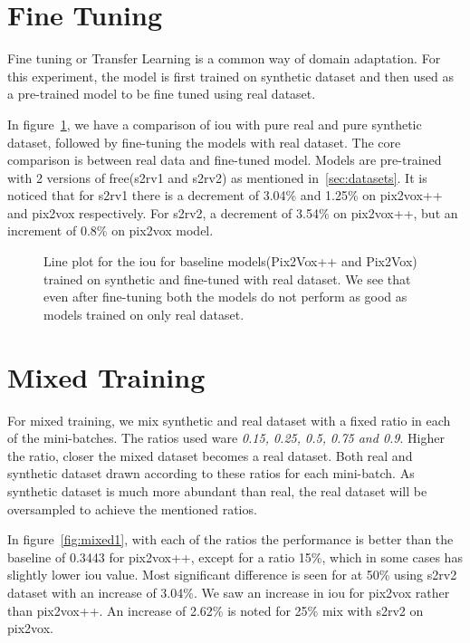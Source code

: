 
\section{Fine Tuning}\label{sec:fine-tuning}
Fine tuning or Transfer Learning is a common way of domain adaptation.
For this experiment, the model is first trained on synthetic dataset and then used as a pre-trained model to be fine tuned using real dataset.

In figure~\ref{fig:finetuning1}, we have a comparison of \gls{iou}  with pure real and pure synthetic dataset, followed by fine-tuning the models with real dataset.
The core comparison is between real data and fine-tuned model.
Models are pre-trained with 2 versions of \gls{free}(\gls{s2rv1} and \gls{s2rv2}) as mentioned in~\ref{sec:datasets}.
It is noticed that for \gls{s2rv1} there is a decrement of 3.04\% and 1.25\% on pix2vox++ and pix2vox respectively.
For \gls{s2rv2}, a decrement of 3.54\% on pix2vox++, but an increment of 0.8\% on pix2vox model.

\begin{figure}
    \centering
    \resizebox{0.7\textwidth}{!}{}
    \caption{Line plot for the \gls{iou} for baseline models(Pix2Vox++ and Pix2Vox) trained on synthetic and fine-tuned with real dataset.
    We see that even after fine-tuning both the models do not perform as good as models trained on only real dataset.}
    \label{fig:finetuning1}
\end{figure}

\section{Mixed Training}\label{sec:mixed-training}
For mixed training, we mix synthetic and real dataset with a fixed ratio in each of the mini-batches.
The ratios used ware \emph{0.15, 0.25, 0.5, 0.75 and 0.9}.
Higher the ratio, closer the mixed dataset becomes a real dataset.
Both real and synthetic dataset drawn according to these ratios for each mini-batch.
As synthetic dataset is much more abundant than real, the real dataset will be oversampled to achieve the mentioned ratios.

In figure~\ref{fig:mixed1}, with each of the ratios the performance is better than the baseline of 0.3443 for pix2vox++,
except for a ratio 15\%, which in some cases has slightly lower \gls{iou}  value.
Most significant difference is seen for at 50\% using \gls{s2rv2} dataset with an increase of 3.04\%.
We saw an increase in \gls{iou} for pix2vox rather than pix2vox++.
An increase of 2.62\% is noted for 25\% mix with \gls{s2rv2} on pix2vox.

